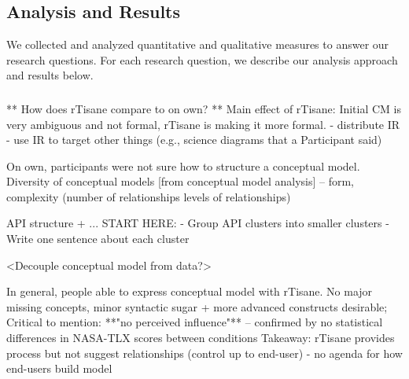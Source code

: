 
\subsection{Analysis and Results}
We collected and analyzed quantitative and qualitative measures to answer our
research questions. For each research question, we describe our analysis
approach and results below. 


\subsubsection{\evalConceptualModels}
** How does rTisane compare to on own? **
Main effect of rTisane: Initial CM is very ambiguous and not formal, rTisane is making it more formal. 
- distribute IR
- use IR to target other things (e.g., science diagrams that a Participant said)

On own, participants were not sure how to structure a conceptual model. 
Diversity of conceptual models [from conceptual model analysis] -- form, complexity (number of relationships levels of relationships)


API structure + ... 
START HERE: 
- Group API clusters into smaller clusters
- Write one sentence about each cluster

<Decouple conceptual model from data?>

In general, people able to express conceptual model with rTisane. No major missing concepts, minor syntactic sugar + more advanced constructs desirable;
Critical to mention: **"no perceived influence"** -- confirmed by no statistical differences in NASA-TLX scores between conditions
Takeaway: rTisane provides process but not suggest relationships (control up to end-user) - no agenda for how end-users build model

